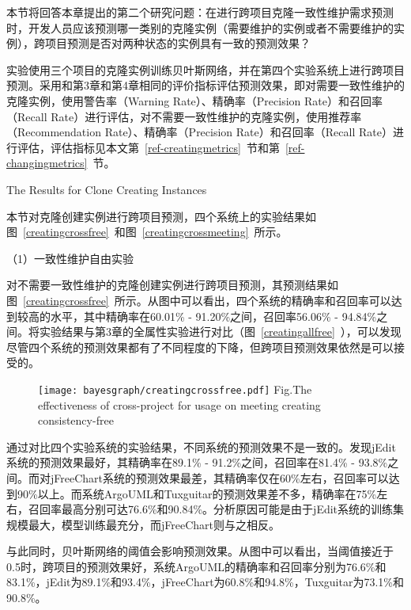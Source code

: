 本节将回答本章提出的第二个研究问题：在进行跨项目克隆一致性维护需求预测时，开发人员应该预测哪一类别的克隆实例（需要维护的实例或者不需要维护的实例），跨项目预测是否对两种状态的实例具有一致的预测效果？

实验使用三个项目的克隆实例训练贝叶斯网络，并在第四个实验系统上进行跨项目预测。采用和第3章和第4章相同的评价指标评估预测效果，即对需要一致性维护的克隆实例，使用警告率（Warning Rate）、精确率（Precision Rate）和召回率（Recall Rate）进行评估，对不需要一致性维护的克隆实例，使用推荐率（Recommendation Rate）、精确率（Precision Rate）和召回率（Recall Rate）进行评估，评估指标见本文第~\ref{ref-creatingmetrics}~节和第~\ref{ref-changingmetrics}~节。

{The Results for Clone Creating Instances}

本节对克隆创建实例进行跨项目预测，四个系统上的实验结果如图~\ref{creatingcrossfree}~和图~\ref{creatingcrossmeeting}~所示。


（1）一致性维护自由实验

对不需要一致性维护的克隆创建实例进行跨项目预测，其预测结果如图~\ref{creatingcrossfree}~所示。从图中可以看出，四个系统的精确率和召回率可以达到较高的水平，其中精确率在60.01\% - 91.20\%之间，召回率56.06\% - 94.84\%之间。将实验结果与第3章的全属性实验进行对比（图~\ref{creatingallfree}~），可以发现尽管四个系统的预测效果都有了不同程度的下降，但跨项目预测效果依然是可以接受的。

\begin{figure}[h]
\centering
\texttt{[image: bayesgraph/creatingcrossfree.pdf]}
{Fig.$\!$}{The effectiveness of cross-project for usage on meeting creating consistency-free}
\vspace{-1em}
\end{figure}

通过对比四个实验系统的实验结果，不同系统的预测效果不是一致的。发现jEdit系统的预测效果最好，其精确率在89.1\% - 91.2\%之间，召回率在81.4\% - 93.8\%之间。而对jFreeChart系统的预测效果最差，其精确率仅在60\%左右，召回率可以达到90\%以上。而系统ArgoUML和Tuxguitar的预测效果差不多，精确率在75\%左右，召回率最高分别可达76.6\%和90.84\%。分析原因可能是由于jEdit系统的训练集规模最大，模型训练最充分，而jFreeChart则与之相反。

与此同时，贝叶斯网络的阈值会影响预测效果。从图中可以看出，当阈值接近于0.5时，跨项目的预测效果好，系统ArgoUML的精确率和召回率分别为76.6\%和83.1\%，jEdit为89.1\%和93.4\%，jFreeChart为60.8\%和94.8\%，Tuxguitar为73.1\%和90.8\%。

